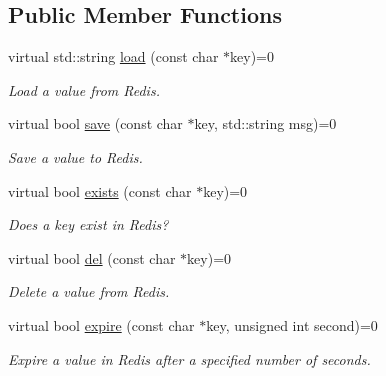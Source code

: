 \subsection*{Public Member Functions}
\begin{DoxyCompactItemize}
\item 
\hypertarget{classRedisInterface_afd325866fd98ca6e002b2702e5566ee5}{virtual std\-::string \hyperlink{classRedisInterface_afd325866fd98ca6e002b2702e5566ee5}{load} (const char $\ast$key)=0}\label{classRedisInterface_afd325866fd98ca6e002b2702e5566ee5}

\begin{DoxyCompactList}\small\item\em Load a value from Redis. \end{DoxyCompactList}\item 
\hypertarget{classRedisInterface_adb0d6e3f8a0848cbb6b346e57aeb3ad5}{virtual bool \hyperlink{classRedisInterface_adb0d6e3f8a0848cbb6b346e57aeb3ad5}{save} (const char $\ast$key, std\-::string msg)=0}\label{classRedisInterface_adb0d6e3f8a0848cbb6b346e57aeb3ad5}

\begin{DoxyCompactList}\small\item\em Save a value to Redis. \end{DoxyCompactList}\item 
\hypertarget{classRedisInterface_a3881f54b919852b7aaa231015775544e}{virtual bool \hyperlink{classRedisInterface_a3881f54b919852b7aaa231015775544e}{exists} (const char $\ast$key)=0}\label{classRedisInterface_a3881f54b919852b7aaa231015775544e}

\begin{DoxyCompactList}\small\item\em Does a key exist in Redis? \end{DoxyCompactList}\item 
\hypertarget{classRedisInterface_abb9b1fe2c11911648d62d431968fa04e}{virtual bool \hyperlink{classRedisInterface_abb9b1fe2c11911648d62d431968fa04e}{del} (const char $\ast$key)=0}\label{classRedisInterface_abb9b1fe2c11911648d62d431968fa04e}

\begin{DoxyCompactList}\small\item\em Delete a value from Redis. \end{DoxyCompactList}\item 
\hypertarget{classRedisInterface_ac327841b5c3d227be88f164495e32dd0}{virtual bool \hyperlink{classRedisInterface_ac327841b5c3d227be88f164495e32dd0}{expire} (const char $\ast$key, unsigned int second)=0}\label{classRedisInterface_ac327841b5c3d227be88f164495e32dd0}

\begin{DoxyCompactList}\small\item\em Expire a value in Redis after a specified number of seconds. \end{DoxyCompactList}\end{DoxyCompactItemize}



